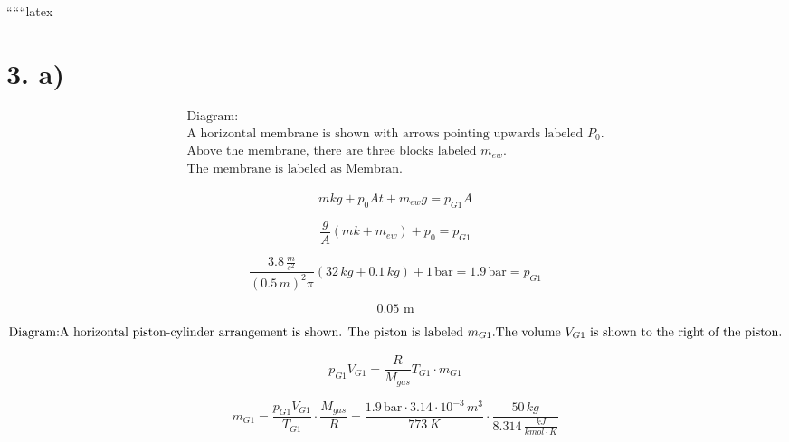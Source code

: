 
``````latex


\section*{3. a)}

\begin{equation*}
\begin{array}{l}
\text{Diagram:} \\
\text{A horizontal membrane is shown with arrows pointing upwards labeled } P_0. \\
\text{Above the membrane, there are three blocks labeled } m_{ew}. \\
\text{The membrane is labeled as } \text{Membran}. \\
\end{array}
\end{equation*}

\begin{equation*}
m k g + p_0 A t + m_{ew} g = p_{G1} A
\end{equation*}

\begin{equation*}
\frac{g}{A} (m k + m_{ew}) + p_0 = p_{G1}
\end{equation*}

\begin{equation*}
\frac{3.8 \, \frac{m}{s^2}}{(0.5 \, m)^2 \pi} (32 \, kg + 0.1 \, kg) + 1 \, \text{bar} = 1.9 \, \text{bar} = p_{G1}
\end{equation*}

\begin{equation*}
\text{0.05 m}
\end{equation*}

\begin{equation*}
\text{Diagram:} \\
\text{A horizontal piston-cylinder arrangement is shown. The piston is labeled } m_{G1}. \\
\text{The volume } V_{G1} \text{ is shown to the right of the piston.} \\
\end{equation*}

\begin{equation*}
p_{G1} V_{G1} = \frac{R}{M_{gas}} T_{G1} \cdot m_{G1}
\end{equation*}

\begin{equation*}
m_{G1} = \frac{p_{G1} V_{G1}}{T_{G1}} \cdot \frac{M_{gas}}{R} = \frac{1.9 \, \text{bar} \cdot 3.14 \cdot 10^{-3} \, m^3}{773 \, K} \cdot \frac{50 \, kg}{8.314 \, \frac{kJ}{kmol \cdot K}}
\end{equation*}

